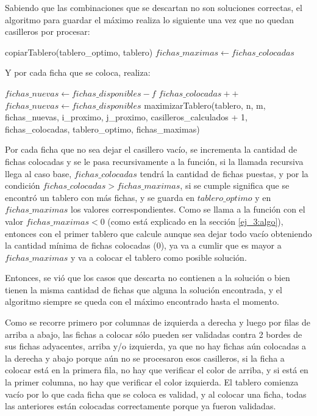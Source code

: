 Sabiendo que las combinaciones que se descartan no son soluciones correctas, el algoritmo para guardar el m\'aximo realiza lo siguiente una vez que no quedan casilleros por procesar:
\begin{algorithmic}
		\State copiarTablero(tablero\_optimo, tablero)
		\State $fichas\_maximas \gets fichas\_colocadas$
	\EndIf
\end{algorithmic}
Y por cada ficha que se coloca, realiza:
\begin{algorithmic}
		\State $fichas\_nuevas \gets fichas\_disponibles - f$
		\State $fichas\_colocadas++$
	\Else
		\State $fichas\_nuevas \gets fichas\_disponibles$
	\EndIf
	\State maximizarTablero(tablero, n, m, fichas\_nuevas, i\_proximo, j\_proximo, casilleros\_calculados + 1, fichas\_colocadas, tablero\_optimo, fichas\_maximas)
\end{algorithmic}
Por cada ficha que no sea dejar el casillero vac\'io, se incrementa la cantidad de fichas colocadas y se le pasa recursivamente a la funci\'on, si la llamada recursiva llega al caso base, $fichas\_colocadas$ tendr\'a la cantidad de fichas puestas,
y por la condici\'on $fichas\_colocadas > fichas\_maximas$, si se cumple significa que se encontr\'o un tablero con m\'as fichas, y se guarda en $tablero\_optimo$ y en $fichas\_maximas$ los valores correspondientes. Como se llama a la funci\'on con el valor $fichas\_maximas < 0$ (como est\'a explicado en la secci\'on \ref{ej_3:algo}), entonces con el primer tablero que calcule aunque sea dejar todo vac\'io obteniendo la cantidad m\'inima de fichas colocadas ($0$), ya va a cumlir que es mayor a $fichas\_maximas$ y va a colocar el tablero como posible soluci\'on.

Entonces, se vi\'o que los casos que descarta no contienen a la soluci\'on o bien tienen la misma cantidad de fichas que alguna la soluci\'on encontrada, y el algoritmo siempre se queda con el m\'aximo encontrado hasta el momento.

Como se recorre primero por columnas de izquierda a derecha y luego por filas de arriba a abajo, las fichas a colocar s\'olo pueden ser validadas contra 2 bordes de sus fichas adyacentes, arriba y/o izquierda, ya que no hay fichas a\'un colocadas a la derecha y abajo porque a\'un no se procesaron esos casilleros, si la ficha a colocar est\'a en la primera fila, no hay que verificar el color de arriba, y si est\'a en la primer columna, no hay que verificar el color izquierda. El tablero comienza vac\'io por lo que cada ficha que se coloca es validad, y al colocar una ficha, todas las anteriores est\'an colocadas correctamente porque ya fueron validadas. 

